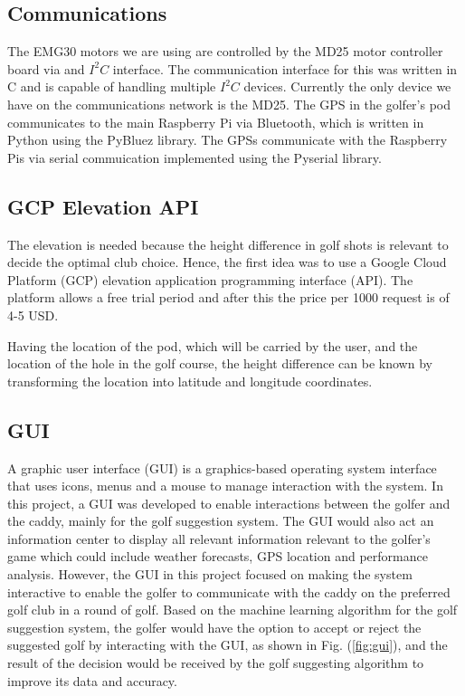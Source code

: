 \documentclass[11pt,landscape]{article}
\begin{document}
\begin{multicols}{3}

\subsection{Communications}
The EMG30 motors we are using are controlled by the MD25 motor controller board
via and $I^2C$ interface. The communication interface for this was written in C
and is capable of handling multiple $I^2C$ devices. Currently the only device we
have on the communications network is the MD25. The GPS in the golfer's pod
communicates to the main Raspberry Pi via Bluetooth, which is written in Python
using the PyBluez library. The GPSs communicate with the Raspberry Pis via
serial commuication implemented using the Pyserial library.

\subsection{GCP Elevation API}
The elevation is needed because the height difference in golf shots is relevant
to decide the optimal club choice. Hence, the first idea was to use a Google
Cloud Platform (GCP) elevation application programming interface (API). The
platform allows a free trial period and after this the price per 1000 request is
of 4-5 USD. 

Having the location of the pod, which will be carried by the user, and the
location of the hole in the golf course, the height difference can be known by
transforming the location into latitude and longitude coordinates.


\subsection{GUI}

A graphic user interface (GUI) is a graphics-based operating system interface
that uses icons, menus and a mouse to manage interaction with the system. In
this project, a GUI was developed to enable interactions between the golfer and
the caddy, mainly for the golf suggestion system. The GUI would also act an
information center to display all relevant information relevant to the golfer’s
game which could include weather forecasts, GPS location and performance
analysis. However, the GUI in this project focused on making the system
interactive to enable the golfer to communicate with the caddy on the preferred
golf club in a round of golf. Based on the machine learning algorithm for the
golf suggestion system, the golfer would have the option to accept or reject the
suggested golf by interacting with the GUI, as shown in Fig. (\ref{fig:gui}),
and the result of the decision would be received by the golf suggesting
algorithm to improve its data and accuracy. 


\end{multicols}
\end{document}
